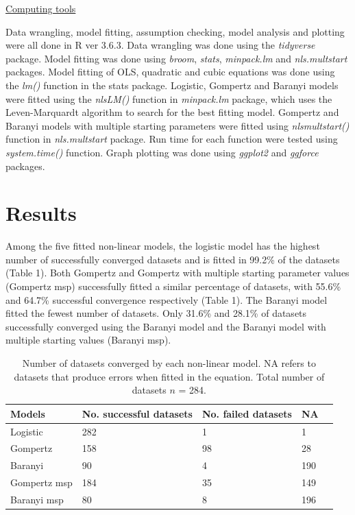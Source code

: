 \documentclass[11pt]{article}
\begin{document}
\underline{Computing tools}

Data wrangling, model fitting, assumption checking, model analysis and plotting were all done in R ver 3.6.3. Data wrangling was done using the \emph{tidyverse} package. Model fitting was done using \emph{broom}, \emph{stats}, \emph{minpack.lm} and \emph{nls.multstart} packages. Model fitting of OLS, quadratic and cubic equations was done using the \emph{lm()} function in the stats package. Logistic, Gompertz and Baranyi models were fitted using the \emph{nlsLM()} function in \emph{minpack.lm} package, which uses the Leven-Marquardt algorithm to search for the best fitting model. Gompertz and Baranyi models with multiple starting parameters were fitted using \emph{nls\textunderscore multstart()} function in \emph{nls.multstart} package. Run time for each function were tested using \emph{system.time()} function. Graph plotting was done using \emph{ggplot2} and \emph{ggforce} packages. 
\vspace{\baselineskip}

\section{Results}

Among the five fitted non-linear models, the logistic model has the highest number of successfully converged datasets and is fitted in 99.2\% of the datasets (Table 1). Both Gompertz and Gompertz with multiple starting parameter values (Gompertz msp) successfully fitted a similar percentage of datasets, with 55.6\% and 64.7\% successful convergence respectively (Table 1). The Baranyi model fitted the fewest number of datasets. Only 31.6\% and 28.1\% of datasets successfully converged using the Baranyi model and the Baranyi model with multiple starting values (Baranyi msp).
\vspace{\baselineskip}

\begin{table}[H]
\caption{Number of datasets converged by each non-linear model. NA refers to datasets that produce errors when fitted in the equation. Total number of datasets \(n\) = 284.}
\begin{tabular}{@{}lllll@{}}
\toprule
Models       & No. successful datasets & No. failed datasets & NA  &  \\ \midrule
Logistic     & 282                     & 1                   & 1   &  \\
Gompertz     & 158                     & 98                  & 28  &  \\
Baranyi      & 90                      & 4                   & 190 &  \\
Gompertz msp & 184                     & 35                  & 149 &  \\
Baranyi msp  & 80                      & 8                   & 196 &  \\ \bottomrule
\end{tabular}
\end{table}
\end{document}
